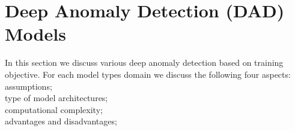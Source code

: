 \section{Deep Anomaly Detection (DAD) Models}
\label{sec:deepDADModels}

In this section we discuss various deep anomaly detection based on training objective. For each model types domain we discuss the following four aspects:\\
\textemdash assumptions;\\
\textemdash type of model architectures;\\
\textemdash computational complexity;\\
\textemdash advantages and disadvantages;\\


\label{sec:supervised}


\label{sec:semiSupervised}


\label{sec:hybrid}


\label{sec:oneClassNeuralNetworks}


\label{sec:unsupervised}


\label{sec:others}
